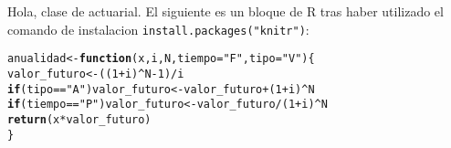 \documentclass{article}\usepackage[]{graphicx}\usepackage[]{color}
\makeatletter
\newcommand{\hlnum}[1]{\textcolor[rgb]{0.686,0.059,0.569}{#1}}%
\newcommand{\hlstr}[1]{\textcolor[rgb]{0.192,0.494,0.8}{#1}}%
\newcommand{\hlopt}[1]{\textcolor[rgb]{0,0,0}{#1}}%
\newcommand{\hlstd}[1]{\textcolor[rgb]{0.345,0.345,0.345}{#1}}%
\newcommand{\hlkwa}[1]{\textcolor[rgb]{0.161,0.373,0.58}{\textbf{#1}}}%
\newcommand{\hlkwb}[1]{\textcolor[rgb]{0.69,0.353,0.396}{#1}}%
\newcommand{\hlkwc}[1]{\textcolor[rgb]{0.333,0.667,0.333}{#1}}%
\newcommand{\hlkwd}[1]{\textcolor[rgb]{0.737,0.353,0.396}{\textbf{#1}}}%
\newenvironment{kframe}{%
 \def\at@end@of@kframe{}%
 \ifinner\ifhmode%
  \def\at@end@of@kframe{\end{minipage}}%
  \begin{minipage}{\columnwidth}%
 \fi\fi%
 \def\FrameCommand##1{\hskip\@totalleftmargin \hskip-\fboxsep
 \colorbox{shadecolor}{##1}\hskip-\fboxsep
     \hskip-\linewidth \hskip-\@totalleftmargin \hskip\columnwidth}%
 \MakeFramed {\advance\hsize-\width
   \@totalleftmargin\z@ \linewidth\hsize
   \@setminipage}}%
 {\par\unskip\endMakeFramed%
 \at@end@of@kframe}
\newenvironment{knitrout}{}{} %
\makeatother
\begin{document}
\noindent Hola, clase de actuarial. El siguiente es un bloque de R tras haber utilizado el comando de instalacion \texttt{install.packages("knitr")}:
\begin{knitrout}
\color{fgcolor}\begin{kframe}
\begin{alltt}
\hlstd{anualidad} \hlkwb{<-} \hlkwa{function}\hlstd{(}\hlkwc{x}\hlstd{,}\hlkwc{i}\hlstd{,} \hlkwc{N}\hlstd{,} \hlkwc{tiempo} \hlstd{=} \hlstr{"F"}\hlstd{,} \hlkwc{tipo} \hlstd{=} \hlstr{"V"}\hlstd{)\{}
  \hlstd{valor_futuro} \hlkwb{<-} \hlstd{((}\hlnum{1}\hlopt{+}\hlstd{i)}\hlopt{^}\hlstd{N} \hlopt{-}\hlnum{1}\hlstd{)}\hlopt{/}\hlstd{i}
  \hlkwa{if}\hlstd{(tipo} \hlopt{==} \hlstr{"A"}\hlstd{) valor_futuro} \hlkwb{<-} \hlstd{valor_futuro}\hlopt{+}\hlstd{(}\hlnum{1}\hlopt{+}\hlstd{i)}\hlopt{^}\hlstd{N}
  \hlkwa{if}\hlstd{(tiempo} \hlopt{==} \hlstr{"P"}\hlstd{) valor_futuro} \hlkwb{<-} \hlstd{valor_futuro}\hlopt{/}\hlstd{(}\hlnum{1}\hlopt{+}\hlstd{i)}\hlopt{^}\hlstd{N}
  \hlkwd{return}\hlstd{(x}\hlopt{*}\hlstd{valor_futuro)}
\hlstd{\}}
\end{alltt}
\end{kframe}
\end{knitrout}
\end{document}
